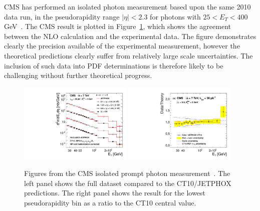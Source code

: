 CMS has performed an isolated photon measurement based upon the same 2010 data run, in the pseudorapidity range $|\eta| < 2.3$ for photons with $25 < E_T < 400$ GeV~\cite{Chatrchyan:2011ue}. The CMS result is plotted in Figure~\ref{fig:CMSpromptphoton}, which shows the agreement between the NLO calculation and the experimental data. The figure demonstrates clearly the precision available of the experimental measurement, however the theoretical predictions clearly suffer from relatively large scale uncertainties. The inclusion of such data into PDF determinations is therefore likely to be challenging without further theoretical progress.

\begin{figure}[ht]
\centering
\includegraphics[width=0.48\textwidth]{5-LHCdata/figs/xs_ct10_data_add.pdf}
\includegraphics[width=0.48\textwidth]{5-LHCdata/figs/xs_ct10_data_ratio_eta1.pdf}
\caption[CMS isolated prompt photon measurement]{Figures from the CMS isolated prompt photon measurement~\cite{Chatrchyan:2011ue}. The left panel shows the full dataset compared to the CT10/JETPHOX predictions. The right panel shows the result for the lowest pseudorapidity bin as a ratio to the CT10 central value.}
\label{fig:CMSpromptphoton}
\end{figure}

